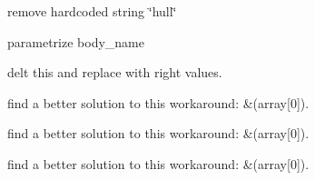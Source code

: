 
\begin{DoxyRefList}
\item[\label{todo__todo000004}%
\hypertarget{todo__todo000004}{}%
Member \hyperlink{classskye__ros_1_1_skye_ros_a3b89852664ebf528e0efd005dfee1cb6}{skye\-\_\-ros\-:\-:Skye\-Ros\-:\-:apply\-Wrench\-Cog} (skye\-\_\-ros\-::\-Apply\-Wrench\-Cog\-Bf\-::\-Request \&req, skye\-\_\-ros\-::\-Apply\-Wrench\-Cog\-Bf\-::\-Response \&rep)]remove hardcoded string \char`\"{}hull\char`\"{} 

parametrize body\-\_\-name  
\item[\label{todo__todo000006}%
\hypertarget{todo__todo000006}{}%
Member \hyperlink{classskye__ros_1_1_skye_ros_ac4bd9e5c80045fdf72a0e43eb43434e2}{skye\-\_\-ros\-:\-:Skye\-Ros\-:\-:get\-Link\-State\-Ned} (const std\-::string link\-\_\-name, skye\-\_\-ros\-::\-Get\-Link\-State\-Ned\-::\-Response \&rep)]delt this and replace with right values.  
\item[\label{todo__todo000001}%
\hypertarget{todo__todo000001}{}%
Member \hyperlink{classskye__ros_1_1_skye_ros_a7fce94bed2f513ee63aac089ccf40538}{skye\-\_\-ros\-:\-:Skye\-Ros\-:\-:imu\-Callback} (const sensor\-\_\-msgs\-::\-Imu\-Const\-Ptr \&imu\-\_\-gz\-\_\-sk\-\_\-p)]find a better solution to this workaround\-: \&(array\mbox{[}0\mbox{]}). 

find a better solution to this workaround\-: \&(array\mbox{[}0\mbox{]}). 

find a better solution to this workaround\-: \&(array\mbox{[}0\mbox{]}). 
\end{DoxyRefList}